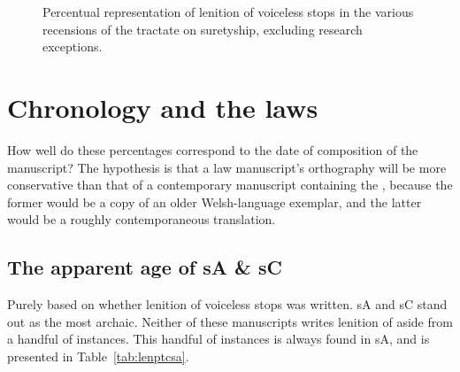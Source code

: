   \begin{figure}[h]
    \centering
    \caption{Percentual representation of lenition of voiceless stops in the various recensions of the tractate on suretyship, excluding research exceptions.}
    \label{fig:barchartlaws}
  \end{figure}

\section{Chronology and the laws}
\label{sec:chronology-laws}


How well do these percentages correspond to the date of composition of the manuscript? The hypothesis is that a law manuscript's orthography will be more conservative than that of a contemporary manuscript containing the , because the former would be a copy of an older Welsh-language exemplar, and the latter would be a roughly contemporaneous translation.

\subsection{The apparent age of \gls{sA} \& \gls{sC}}
\label{sec:glsa--glsc}


Purely based on whether lenition of voiceless stops was written. \gls{sA} and \gls{sC} stand out as the most archaic. Neither of these manuscripts writes lenition of  aside from a handful of instances. This handful of instances is always found in \gls{sA}, and is presented in Table~\ref{tab:lenptcsa}.

